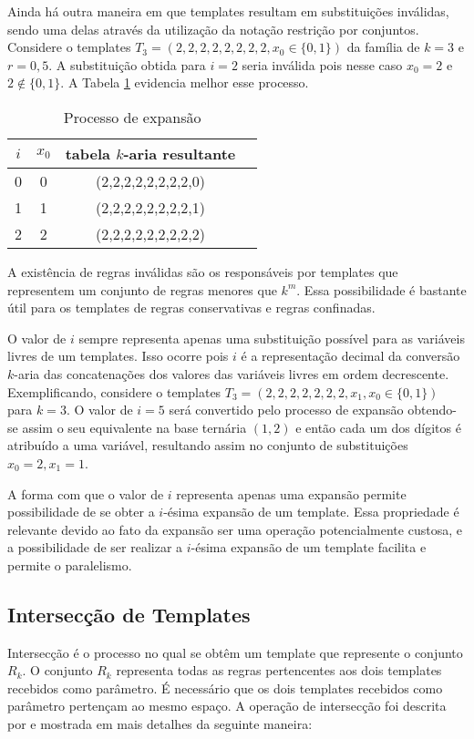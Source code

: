 Ainda há outra maneira em que templates resultam em substituições inválidas, sendo uma delas através da utilização da notação restrição por conjuntos. Considere o templates $T_3 = (2,2,2,2,2,2,2,2,x_0\in \{0,1\})$ da família de $k=3$ e $r=0,5$. A substituição obtida para $i = 2$ seria inválida pois nesse caso $x_0 = 2$ e $2 \notin \{0,1\}$. A Tabela \ref{tab:invalideExpansion2} evidencia melhor esse processo.

\begin{table}[h!]
\centering
\caption{Processo de expansão}
{
	\vspace{0.3cm}
	\begin{tabular}{cccc}
	\hline
	$i$ & $x_0$ & tabela $k$-aria resultante \\
	\hline
	0	&	0	&	(2,2,2,2,2,2,2,2,0)	\\
	1	&	1	&	(2,2,2,2,2,2,2,2,1)	\\
	2	&	2	&	(2,2,2,2,2,2,2,2,2)	\\
	\hline
	\end{tabular}
}
\label{tab:invalideExpansion2}
\end{table}

A existência de regras inválidas são os responsáveis por templates que representem um conjunto de regras menores que $k^m$. Essa possibilidade é bastante útil para os templates de regras conservativas e regras confinadas.

O valor de $i$ sempre representa apenas uma substituição possível para as variáveis livres de um templates. Isso ocorre pois $i$ é a representação decimal da conversão $k$-aria das concatenações dos valores das variáveis livres em ordem decrescente. Exemplificando, considere o templates $T_3 = (2,2,2,2,2,2,2,x_1,x_0\in \{0,1\})$ para $k=3$. O valor de $i=5$ será convertido pelo processo de expansão obtendo-se assim o seu equivalente na base ternária $(1,2)$ e então cada um dos dígitos é atribuído a uma variável, resultando assim no conjunto de substituições ${x_0=2,x_1=1}$.

A forma com que o valor de $i$ representa apenas uma expansão permite possibilidade de se obter a $i$-ésima expansão de um template. Essa propriedade é relevante devido ao fato da expansão ser uma operação potencialmente custosa, e a possibilidade de ser realizar a $i$-ésima expansão de um template facilita e permite o paralelismo.

\newpage\newpage
\subsection{Intersecção de Templates}
Intersecção é o processo no qual se obtêm um template que represente o conjunto $R_k$. O conjunto $R_k$ representa todas as regras pertencentes aos dois templates recebidos como parâmetro. É necessário que os dois templates recebidos como parâmetro pertençam ao mesmo espaço. A operação de intersecção foi descrita por  e mostrada em mais detalhes da seguinte maneira:


